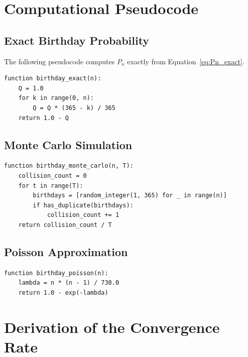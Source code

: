 \documentclass[12pt]{report}
\theoremstyle{definition}
\begin{document}
\appendix
\chapter{Computational Pseudocode}

\section{Exact Birthday Probability}

The following pseudocode computes $P_n$ exactly from Equation~\eqref{eq:Pn_exact}.

\begin{lstlisting}[basicstyle=\small\ttfamily, frame=single,
                   caption={Exact birthday probability computation.}]
function birthday_exact(n):
    Q = 1.0
    for k in range(0, n):
        Q = Q * (365 - k) / 365
    return 1.0 - Q
\end{lstlisting}

\section{Monte Carlo Simulation}

\begin{lstlisting}[basicstyle=\small\ttfamily, frame=single,
                   caption={Monte Carlo estimation of $P_n$ with $T$ trials.}]
function birthday_monte_carlo(n, T):
    collision_count = 0
    for t in range(T):
        birthdays = [random_integer(1, 365) for _ in range(n)]
        if has_duplicate(birthdays):
            collision_count += 1
    return collision_count / T
\end{lstlisting}

\section{Poisson Approximation}

\begin{lstlisting}[basicstyle=\small\ttfamily, frame=single,
                   caption={Poisson approximation for $P_n$.}]
function birthday_poisson(n):
    lambda = n * (n - 1) / 730.0
    return 1.0 - exp(-lambda)
\end{lstlisting}

\chapter{Derivation of the Convergence Rate}
\end{document}

